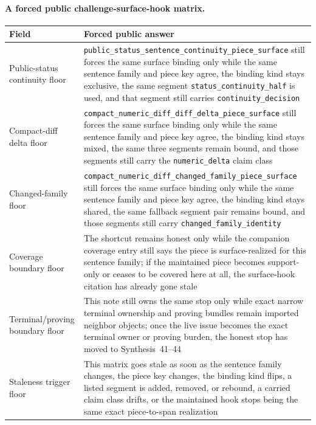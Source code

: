 \documentclass[11pt]{article}
\begin{document}
\paragraph{A forced public challenge-surface-hook matrix.}
\begin{table}[t]
\centering
\small
\begin{tabularx}{\linewidth}{@{}lX@{}}
\toprule
Field & Forced public answer \\
\midrule
Public-status continuity floor & \nolinkurl{public_status_sentence_continuity_piece_surface} still forces the same surface binding only while the same sentence family and piece key agree, the binding kind stays \textsf{exclusive}, the same segment \nolinkurl{status_continuity_half} is used, and that segment still carries \nolinkurl{continuity_decision} \\
Compact-diff delta floor & \nolinkurl{compact_numeric_diff_diff_delta_piece_surface} still forces the same surface binding only while the same sentence family and piece key agree, the binding kind stays \textsf{mixed}, the same three segments remain bound, and those segments still carry the \nolinkurl{numeric_delta} claim class \\
Changed-family floor & \nolinkurl{compact_numeric_diff_changed_family_piece_surface} still forces the same surface binding only while the same sentence family and piece key agree, the binding kind stays \textsf{shared}, the same fallback segment pair remains bound, and those segments still carry \nolinkurl{changed_family_identity} \\
Coverage boundary floor & The shortcut remains honest only while the companion coverage entry still says the piece is \textsf{surface}-realized for this sentence family; if the maintained piece becomes support-only or ceases to be covered here at all, the surface-hook citation has already gone stale \\
Terminal/proving boundary floor & This note still owns the same stop only while exact narrow terminal ownership and proving bundles remain imported neighbor objects; once the live issue becomes the exact terminal owner or proving burden, the honest stop has moved to Synthesis~41--44 \\
Staleness trigger floor & This matrix goes stale as soon as the sentence family changes, the piece key changes, the binding kind flips, a listed segment is added, removed, or rebound, a carried claim class drifts, or the maintained hook stops being the same exact piece-to-span realization \\

\end{tabularx}
\end{table}
\end{document}
